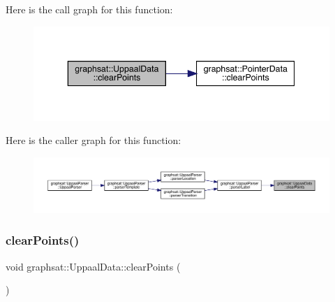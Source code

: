 Here is the call graph for this function\+:\nopagebreak
\begin{figure}[H]
\begin{center}
\leavevmode
\includegraphics[width=343pt]{classgraphsat_1_1_uppaal_data_aa8135b656e806c6c246c45ee88d227fd_cgraph}
\end{center}
\end{figure}
Here is the caller graph for this function\+:\nopagebreak
\begin{figure}[H]
\begin{center}
\leavevmode
\includegraphics[width=350pt]{classgraphsat_1_1_uppaal_data_aa8135b656e806c6c246c45ee88d227fd_icgraph}
\end{center}
\end{figure}
\mbox{\label{classgraphsat_1_1_uppaal_data_a6f8e7702012896ac9757a11b7576546a}} 
\subsubsection{\texorpdfstring{clearPoints()}{clearPoints()}\hspace{0.1cm}{\footnotesize\ttfamily [2/2]}}
{\footnotesize\ttfamily void graphsat\+::\+Uppaal\+Data\+::clear\+Points (\begin{DoxyParamCaption}{ }\end{DoxyParamCaption})\hspace{0.3cm}{\ttfamily [inline]}}

